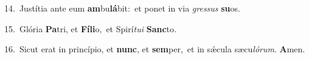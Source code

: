 {\numbfont\textcolor{\numbcolor}{14.}}~Justítia ante eum \textbf{am}\-bu\-\textbf{lá}\-bit:~\star et ponet in via \textit{gres}\-\textit{sus} \textbf{su}\-os.\par
{\numbfont\textcolor{\numbcolor}{15.}}~Glória \textbf{Pa}\-tri, et \textbf{Fí}\-\textbf{li}o,~\star et Spirí\-\textit{tu}\-\textit{i} \textbf{Sanc}\-to.\par
{\numbfont\textcolor{\numbcolor}{16.}}~Sicut erat in princípio, et \textbf{nunc}\-, et \textbf{sem}\-per,~\star et in sǽcula sæcu\-\textit{ló}\-\textit{rum}. \textbf{A}\-men.\par
